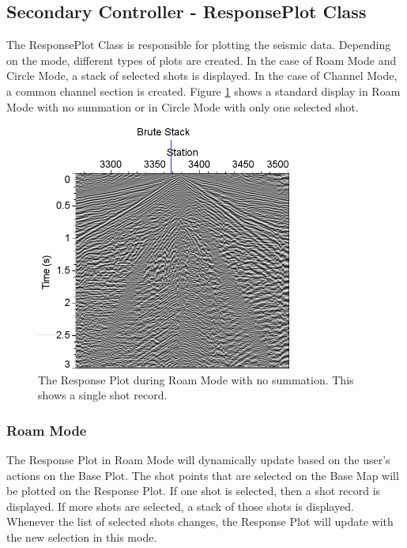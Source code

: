 \documentclass[12pt]{article}
\begin{document}
\subsection{Secondary Controller - ResponsePlot Class}
\label{SUBSEC:RP}

The ResponsePlot Class is responsible for plotting the seismic data. Depending on the mode, different types of plots are created.  In the case of Roam Mode and Circle Mode, a stack of selected shots is displayed. In the case of Channel Mode, a common channel section is created. Figure \ref{FIG:RP} shows a standard display in Roam Mode with no summation or in Circle Mode with only one selected shot.

\begin{figure}[h]
\centering
\includegraphics[width=0.75\textwidth]{./figs/fig4.png}
\caption{The Response Plot during Roam Mode with no summation. This shows a single shot record.}
\label{FIG:RP}
\end{figure}

\subsubsection{Roam Mode}

The Response Plot in Roam Mode will dynamically update based on the user's actions on the Base Plot. The shot points that are selected on the Base Map will be plotted on the Response Plot. If one shot is selected, then a shot record is displayed. If more shots are selected, a stack of those shots is displayed. Whenever the list of selected shots changes, the Response Plot will update with the new selection in this mode.
\end{document}
